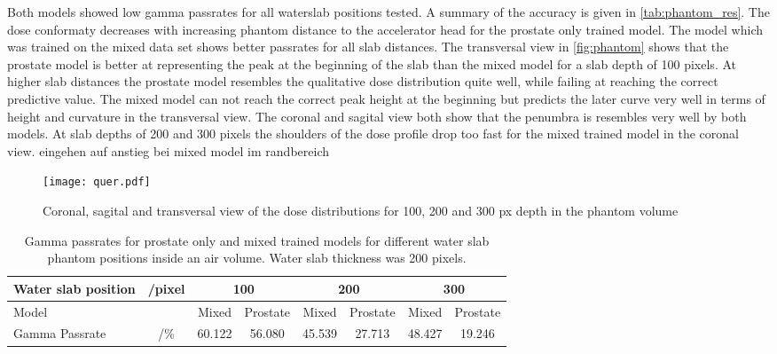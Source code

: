 Both models showed low gamma passrates for all waterslab positions tested. A summary of the accuracy is given in \autoref{tab:phantom_res}. The dose conformaty decreases with increasing phantom distance to the accelerator head for the prostate only trained model. The model which was trained on the mixed data set shows better passrates for all slab distances. The transversal view in \autoref{fig:phantom} shows that the prostate model is better at representing the peak at the beginning of the slab than the mixed model for a slab depth of 100 pixels. At higher slab distances the prostate model resembles the qualitative dose distribution quite well, while failing at reaching the correct predictive value. The mixed model can not reach the correct peak height at the beginning but predicts the later curve very well in terms of height and curvature in the transversal view. The coronal and sagital view both show that the penumbra is resembles very well by both models. At slab depths of 200 and 300 pixels the shoulders of the dose profile drop too fast for the mixed trained model in the coronal view. eingehen auf anstieg bei mixed model im randbereich

\begin{figure}
    \centering
    \texttt{[image: quer.pdf]}
    \caption{Coronal, sagital and transversal view of the dose distributions for 100, 200 and 300 px depth in the phantom volume}\label{fig:phantom}
\end{figure}

\begin{table}[]
    \begin{tabular}{|lc|cc|cc|cc|}
    \hline
    Water slab position & /pixel & \multicolumn{2}{c|}{\textbf{100}} & \multicolumn{2}{c|}{\textbf{200}} & \multicolumn{2}{c|}{\textbf{300}} \\ \hline
    Model               &        & Mixed          & Prostate         & Mixed          & Prostate         & Mixed          & Prostate         \\
    Gamma Passrate      & /\%    & 60.122         & 56.080           & 45.539         & 27.713           & 48.427         & 19.246           \\ \hline
    \end{tabular}
    \caption{Gamma passrates for prostate only and mixed trained models for different water slab phantom positions inside an air volume. Water slab thickness was 200 pixels.}
    \label{tab:phantom_res}
\end{table}